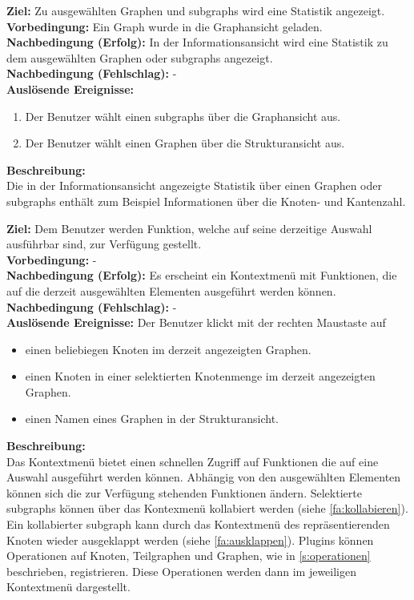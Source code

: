 \label{fa:statistik}
\textbf{Ziel:} Zu ausgewählten Graphen und \glspl{subgraph} wird eine Statistik angezeigt.\\
\textbf{Vorbedingung:} Ein Graph wurde in die Graphansicht geladen.\\
\textbf{Nachbedingung (Erfolg):} In der Informationsansicht wird eine Statistik zu dem ausgewählten Graphen oder \glspl{subgraph} angezeigt.\\
\textbf{Nachbedingung (Fehlschlag):} -\\
\textbf{Auslösende Ereignisse:}
\begin{enumerate}[nolistsep, label=(\alph*)]
  \item Der Benutzer wählt einen \glspl{subgraph} über die Graphansicht aus.
  \item Der Benutzer wählt einen Graphen über die Strukturansicht aus.
\end{enumerate}
\textbf{Beschreibung:}\\
Die in der Informationsansicht angezeigte Statistik über einen Graphen oder \glspl{subgraph} enthält zum Beispiel Informationen über die Knoten- und Kantenzahl.

\label{fa:kontextmenü}
\textbf{Ziel:} Dem Benutzer werden Funktion, welche auf seine derzeitige Auswahl ausführbar sind, zur Verfügung gestellt.\\
\textbf{Vorbedingung:} -\\
\textbf{Nachbedingung (Erfolg):} Es erscheint ein Kontextmenü mit Funktionen, die auf die derzeit ausgewählten Elementen ausgeführt werden können.\\
\textbf{Nachbedingung (Fehlschlag):} -\\
\textbf{Auslösende Ereignisse:} Der Benutzer klickt mit der rechten Maustaste auf
\begin{itemize}[nolistsep]
  \item einen beliebiegen Knoten im derzeit angezeigten Graphen.
  \item einen Knoten in einer selektierten Knotenmenge im derzeit angezeigten Graphen.
  \item einen Namen eines Graphen in der Strukturansicht.
\end{itemize}
\textbf{Beschreibung:}\\
Das Kontextmenü bietet einen schnellen Zugriff auf Funktionen die auf eine Auswahl ausgeführt werden können.
Abhängig von den ausgewählten Elementen können sich die zur Verfügung stehenden Funktionen ändern.
Selektierte \glspl{subgraph} können über das Kontexmenü kollabiert werden (siehe \ref{fa:kollabieren}).
Ein kollabierter \gls{subgraph} kann durch das Kontextmenü des repräsentierenden Knoten wieder ausgeklappt werden (siehe \ref{fa:ausklappen}).
Plugins können Operationen auf Knoten, Teilgraphen und Graphen, wie in \ref{s:operationen} beschrieben, registrieren.
Diese Operationen werden dann im jeweiligen Kontextmenü dargestellt.


